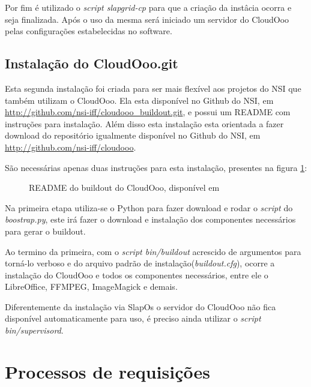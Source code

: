 Por fim é utilizado o \textit{script slapgrid-cp} para que a criação da instâcia ocorra e seja finalizada. Após o uso da mesma será iniciado um servidor do CloudOoo pelas configurações estabelecidas no software.

\subsection{Instalação do CloudOoo.git}

Esta segunda instalação foi criada para ser mais flexível aos projetos do NSI que também utilizam o CloudOoo. Ela esta disponível no Github do NSI, em \url{http://github.com/nsi-iff/cloudooo_buildout.git}, e possui um README com instruções para instalação. Além disso esta instalação esta orientada a fazer download do repositório igualmente disponível no Github do NSI, em \url{http://github.com/nsi-iff/cloudooo}.

São necessárias apenas duas instruções para esta instalação, presentes na figura \ref{buildout-cloudooo}:

\begin{figure}[ht]
    \centering
    \caption{README do buildout do CloudOoo, disponível em \cite{BUILD-CLOUDOOO}}
    \label{buildout-cloudooo}
\end{figure}

Na primeira etapa utiliza-se o Python para fazer download e rodar o \textit{script} do \textit{boostrap.py}, este irá fazer o download e instalação dos componentes necessários para gerar o buildout. 

Ao termino da primeira, com o \textit{script bin/buildout} acrescido de argumentos para torná-lo verboso e do arquivo padrão de instalação(\textit{buildout.cfg}), ocorre a instalação do CloudOoo e todos os componentes necessários, entre ele o LibreOffice, FFMPEG, ImageMagick e demais.

Diferentemente da instalação via SlapOs o servidor do CloudOoo não fica disponível automaticamente para uso, é preciso ainda utilizar o \textit{script bin/supervisord}.

\section{Processos de requisições}

